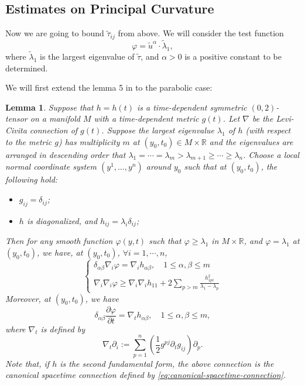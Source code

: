 \documentclass[reqno]{amsart}
\newtheorem{lemma}[theorem]{Lemma}
\theoremstyle{remark}
\newcommand{\R}{\ensuremath{\mathbb{R}}}
\newcommand{\pd}[2]{\frac{\partial {#1}}{\partial {#2}}}
\theoremstyle{definition}
\numberwithin{equation}{section}
\begin{document}
\subsection{Estimates on Principal Curvature}
Now we are going to bound \(\tilde{\tau}_{ij}\) from above. We will consider the test function 
\[ \varphi = {\tilde{u}^\alpha}\cdot{\tilde{\lambda}_1}, \]
where \(\tilde{\lambda}_1\) is the largest eigenvalue of \(\tilde{\tau}\), and \(\alpha> 0\) is a positive constant to be determined. 
\par We will first extend the lemma 5 in \cite{Brendle2017} to the parabolic case:
\begin{lemma}\label{lem:Brendle-lem}
    Suppose that \(h = h(t)\) is a time-dependent symmetric \((0,2)\)-tensor on a manifold \(M\) with a time-dependent metric \(g(t)\). Let \(\nabla\) be the Levi-Civita connection of \(g(t)\). Suppose the largest eigenvalue \(\lambda_1\) of \(h\) (with respect to the metric \(g\)) has multiplicity \(m\) at \((y_0,t_0)\in M \times \R\) and the eigenvalues are arranged in descending order that $\lambda_1 = \cdots = \lambda_m > \lambda_{m+1} \geq \cdots \geq \lambda_n$. 
    Choose a local normal coordinate system $(y^1, \dots, y^n)$ around $y_0$ such that at $(y_0, t_0)$, the following hold: 
    \begin{itemize}
        \item $g_{ij} = \delta_{ij}$; 
        \item $h$ is diagonalized, and $h_{ij} = \lambda_i \delta_{ij}$;
    \end{itemize}
    Then for any smooth function \(\varphi(y,t)\) such that \(\varphi \geq \lambda_1\) in \(M \times \R\), and \(\varphi = \lambda_1\) at \((y_0,t_0)\), we have, at \((y_0,t_0)\), \(\forall i=1,\cdots,n\),
    \begin{equation}\label{eq:Brendle-lem}
        \left\{ \begin{aligned}
                \delta_{\alpha\beta}\nabla_i \varphi = \nabla_i h_{\alpha\beta}, \quad 1\leq \alpha,\beta\leq m \\
                \nabla_i \nabla_i \varphi \geq \nabla_i\nabla_i h_{11} + 2\sum_{p>m}\frac{h_{1pi}^2}{\lambda_1 - \lambda_p}
            \end{aligned}\right. 
    \end{equation}
    Moreover, at \((y_0,t_0)\), we have 
    \begin{equation}\label{eq:Brendle-lem-t}
        \delta_{\alpha\beta}\pd{\varphi}{t} = \nabla_{t}h_{\alpha\beta}, \quad 1\leq \alpha,\beta\leq m,
    \end{equation}
    where \(\nabla_t\) is defined by 
    \begin{equation}
    \nabla_t \partial_i:= \sum_{p=1}^{n}\left(\frac{1}{2}g^{pj}\partial_t g_{ij}\right)\partial_p.    
    \end{equation}  
Note that, if $h$ is the second fundamental form, the above connection is  the canonical spacetime connection defined by \eqref{eq:canonical-spacetime-connection}.
 
 \end{lemma}
\end{document}
